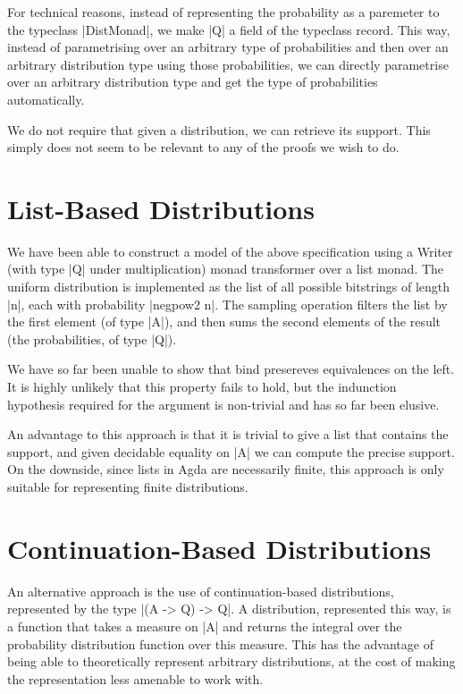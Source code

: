 For technical reasons, instead of representing the probability as a paremeter to the typeclass |DistMonad|, we make |Q|
a field of the typeclass record.  This way, instead of parametrising over an arbitrary type of probabilities and then
over an arbitrary distribution type using those probabilities, we can directly parametrise over an arbitrary
distribution type and get the type of probabilities automatically.

We do not require that given a distribution, we can retrieve its support.  This simply does not seem to be relevant to
any of the proofs we wish to do.

\section{List-Based Distributions}

We have been able to construct a model of the above specification using a Writer (with type |Q| under multiplication)
monad transformer over a list monad.  The uniform distribution is implemented as the list of all possible bitstrings of
length |n|, each with probability |negpow2 n|.  The sampling operation filters the list by the first element (of type
|A|), and then sums the second elements of the result (the probabilities, of type |Q|).

We have so far been unable to show that bind presereves equivalences on the left.  It is highly unlikely that this
property fails to hold, but the indunction hypothesis required for the argument is non-trivial and has so far been
elusive.

An advantage to this approach is that it is trivial to give a list that contains the support, and given decidable
equality on |A| we can compute the precise support.  On the downside, since lists in Agda are necessarily finite, this
approach is only suitable for representing finite distributions.

\section{Continuation-Based Distributions}

An alternative approach is the use of continuation-based distributions, represented by the type |(A -> Q) -> Q|.  A
distribution, represented this way, is a function that takes a measure on |A| and returns the integral over the
probability distribution function over this measure.  This has the advantage of being able to theoretically represent
arbitrary distributions, at the cost of making the representation less amenable to work with.


